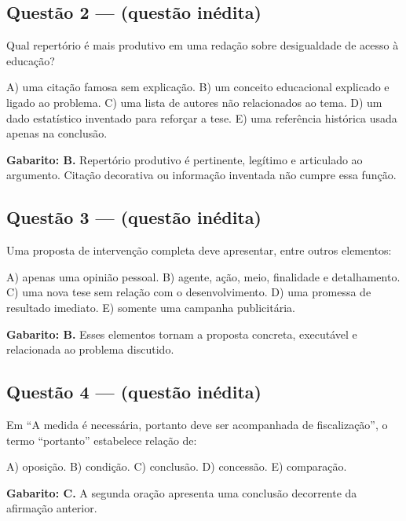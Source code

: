 \documentclass[11pt,a4paper]{article}
\begin{document}
\subsection*{Questão 2 — (questão inédita)}

Qual repertório é mais produtivo em uma redação sobre desigualdade de acesso à educação?

A) uma citação famosa sem explicação. B) um conceito educacional explicado e ligado ao problema. C) uma lista de autores não relacionados ao tema. D) um dado estatístico inventado para reforçar a tese. E) uma referência histórica usada apenas na conclusão.

\begin{alerta}
\textbf{Gabarito: B.} Repertório produtivo é pertinente, legítimo e articulado ao argumento. Citação decorativa ou informação inventada não cumpre essa função.
\end{alerta}

\subsection*{Questão 3 — (questão inédita)}

Uma proposta de intervenção completa deve apresentar, entre outros elementos:

A) apenas uma opinião pessoal. B) agente, ação, meio, finalidade e detalhamento. C) uma nova tese sem relação com o desenvolvimento. D) uma promessa de resultado imediato. E) somente uma campanha publicitária.

\begin{alerta}
\textbf{Gabarito: B.} Esses elementos tornam a proposta concreta, executável e relacionada ao problema discutido.
\end{alerta}

\subsection*{Questão 4 — (questão inédita)}

Em “A medida é necessária, portanto deve ser acompanhada de fiscalização”, o termo “portanto” estabelece relação de:

A) oposição. B) condição. C) conclusão. D) concessão. E) comparação.

\begin{alerta}
\textbf{Gabarito: C.} A segunda oração apresenta uma conclusão decorrente da afirmação anterior.
\end{alerta}
\end{document}
